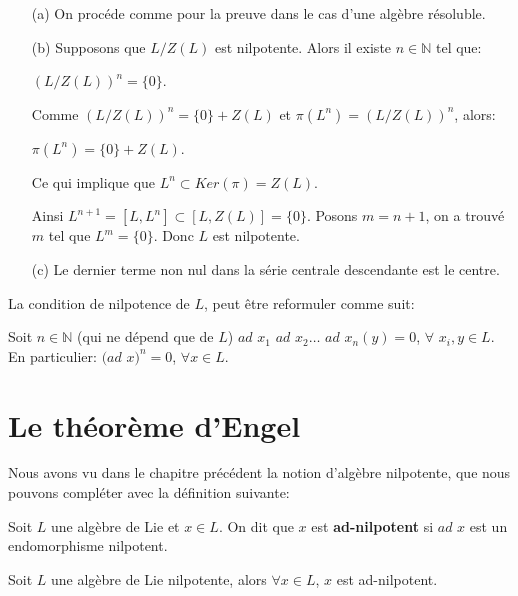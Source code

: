 \documentclass[a4paper,openany,12pt]{report}
\newcommand{\NN}{\mathbb{N}}
\theoremstyle{break}
{\theorembodyfont{\upshape}
\newtheorem*{rmq}{Remarque :}
\newtheorem*{prv}{Preuve :}
\newtheorem*{ex}{Exemples :}
\newtheorem*{exe}{Exemple : }
\newtheorem*{nota}{Notation :}
\newtheorem*{dem}{D\'emonstration :}}
\begin{document}
\begin{prv}
\begin{itemize}
\item[(a)]  On procéde comme pour la preuve dans le cas d'une algèbre résoluble.
\item[(b)]  Supposons que $L/Z(L)$ est nilpotente. Alors il existe $n \in \NN$ tel que:
\begin{center}
$(L/Z(L))^{n}= \{ 0 \}$.
\end{center} 

Comme $(L/Z(L))^{n}= \{ 0 \} +Z(L)$ et $\pi(L^n) = (L/Z(L))^{n}$, alors:
\begin{center}
$\pi(L^n)= \{0\} +Z(L)$.
\end{center}
Ce qui implique que $L^n \subset Ker(\pi)=Z(L)$.

Ainsi $L^{n+1}=[L,L^n] \subset [L,Z(L)]= \{0\}$. Posons $m = n+1$, on a trouvé $m$ tel que $L^m= \{0\}$. Donc $L$ est nilpotente.

\item[(c)] Le dernier terme non nul dans la série centrale descendante est le centre.
\end{itemize}
\end{prv}

\begin{rmq}
\quad La condition de nilpotence de $L$, peut être reformuler comme suit:

Soit $n \in \NN$ (qui ne dépend que de $L$) $ad$ $x_{1}$ $ad$ $x_{2} \ldots$ $ad$ $x_{n}(y)=0$,  $\forall$ $x_{i}, y \in L$.
En particulier:
$(ad$ $x)^n = 0$, $\forall x \in L$.
\end{rmq}


\chapter{Le théorème d'Engel}

\quad Nous avons vu dans le chapitre précédent la notion d'algèbre nilpotente, que nous pouvons compléter avec la définition suivante:

\begin{df}
\quad Soit $L$ une algèbre de Lie et $x \in L$. On dit que $x$ est \textbf{ad-nilpotent} si $ad$ $x$ est un endomorphisme nilpotent. 
\end{df}

\begin{prop}\label{prop:E1}
\quad Soit $L$ une algèbre de Lie nilpotente, alors $\forall x \in L$, $x$ est ad-nilpotent.
\end{prop}
\end{document}
